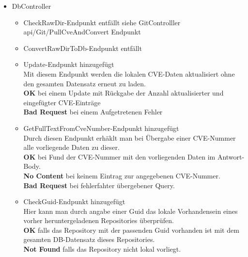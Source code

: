     \begin{itemize}
        \item DbController \label{api_controller:three}
            \begin{itemize}
                \item CheckRawDir-Endpunkt entfällt siehe GitControlller api/Git/PullCveAndConvert Endpunkt
                \item ConvertRawDirToDb-Endpunkt entfällt
                \item Update-Endpunkt hinzugefügt \\
                    Mit diesem Endpunkt werden die lokalen CVE-Daten aktualisiert ohne den gesamten Datensatz erneut zu laden.
                    \\
                    \textbf{OK} bei einem Update mit Rückgabe der Anzahl aktualisierter und eingefügter CVE-Einträge
                    \\
                    \textbf{Bad Request} bei einem Aufgetretenen Fehler
                \item GetFullTextFromCveNumber-Endpunkt hinzugefügt \\
                    Durch diesen Endpunkt erhäklt man bei Übergabe einer CVE-Nummer alle vorliegende Daten zu dieser.
                    \\
                    \textbf{OK} bei Fund der CVE-Nummer mit den vorliegenden Daten im Antwort-Body.
                    \\
                    \textbf{No Content} bei keinem Eintrag zur angegebenen CVE-Nummer. 
                    \\
                    \textbf{Bad Request} bei fehlerfahter übergebener Query.
                \item CheckGuid-Endpunkt hinzugefügt \\
                    Hier kann man durch angabe einer Guid das lokale Vorhandensein eines vorher heruntergeladenen Repositories überprüfen.
                    \\
                    \textbf{OK} falls das Repository mit der passenden Guid vorhanden ist mit dem gesamten DB-Datensatz dieses Repositories.
                    \\
                    \textbf{Not Found} falls das Repository nicht lokal vorliegt.
            \end{itemize}


\end{itemize}
